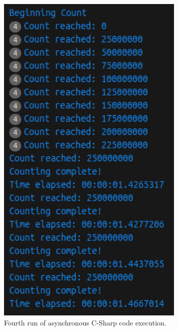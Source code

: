 \documentclass[12pt,a4paper]{article}
\begin{document}
\begin{figure}[htbp]
    \centering
    \includegraphics[width=0.8\textwidth]{../async_records/results_cs/result_4.png}
    \caption{Fourth run of asynchronous C-Sharp code execution.}
    \label{fig:C-Sharp-async-runtime-4}
\end{figure}
\end{document}
